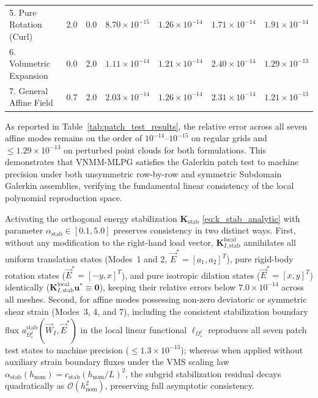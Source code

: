 \documentclass[VANCOUVER,Times1COL]{WileyNJD-v5}
\begin{document}
\begin{table}[!t]
{\begin{tabular}{lcccccc}
            5. Pure Rotation (Curl)    & 2.0                                      & 0.0                                 & $8.70 \times 10^{-15}$                                     & $1.26 \times 10^{-14}$                                     & $1.71 \times 10^{-14}$ & $1.91 \times 10^{-14}$ \\
            6. Volumetric Expansion    & 0.0                                      & 2.0                                 & $1.11 \times 10^{-14}$                                     & $1.21 \times 10^{-14}$                                     & $2.40 \times 10^{-14}$ & $1.29 \times 10^{-13}$ \\
            7. General Affine Field    & 0.7                                      & 2.0                                 & $2.03 \times 10^{-14}$                                     & $1.26 \times 10^{-14}$                                     & $2.31 \times 10^{-14}$ & $1.21 \times 10^{-13}$ \\
            \bottomrule
        \end{tabular}
    }
\end{table}

As reported in Table~\ref{tab:patch_test_results}, the relative error across all seven affine modes remains on the order of $10^{-14}\text{--}10^{-15}$ on regular grids and $\le 1.29 \times 10^{-13}$ on perturbed point clouds for both formulations. This demonstrates that VNMM-MLPG satisfies the Galerkin patch test to machine precision under both unsymmetric row-by-row and symmetric Subdomain Galerkin assemblies, verifying the fundamental linear consistency of the local polynomial reproduction space.

\begin{remark}
\label{rem:patch_test_stab}
    Activating the orthogonal energy stabilization $\mathbf{K}_{\mathrm{stab}}$ \eqref{eq:k_stab_analytic} with parameter $\alpha_{\mathrm{stab}} \in [0.1, 5.0]$ preserves consistency in two distinct ways. First, without any modification to the right-hand load vector, $\mathbf{K}_{I, \mathrm{stab}}^{\mathrm{local}}$ annihilates all uniform translation states (Modes~1 and 2, $\vec{E}^* = [a_1, a_2]^T$), pure rigid-body rotation states ($\vec{E}^* = [-y, x]^T$), and pure isotropic dilation states ($\vec{E}^* = [x, y]^T$) identically ($\mathbf{K}_{I, \mathrm{stab}}^{\mathrm{local}} \mathbf{u}^* \equiv \mathbf{0}$), keeping their relative errors below $7.0 \times 10^{-14}$ across all meshes. Second, for affine modes possessing non-zero deviatoric or symmetric shear strain (Modes~3, 4, and 7), including the consistent stabilization boundary flux $a_{\Omega_s^I}^{\mathrm{stab}}(\vec{W}_I, \vec{E}^*)$ in the local linear functional $\ell_{\Omega_s^I}$ reproduces all seven patch test states to machine precision ($\le 1.3 \times 10^{-13}$); whereas when applied without auxiliary strain boundary fluxes under the VMS scaling law $\alpha_{\mathrm{stab}}(h_{\mathrm{nom}}) = c_{\mathrm{stab}}(h_{\mathrm{nom}}/L)^2$, the subgrid stabilization residual decays quadratically as $\mathcal{O}(h_{\mathrm{nom}}^2)$, preserving full asymptotic consistency.
\end{remark}
\end{document}
